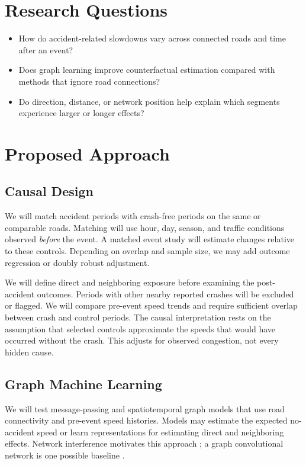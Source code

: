 \documentclass[sigconf,nonacm]{acmart}
\begin{document}
\section{Research Questions}
\begin{itemize}
    \item How do accident-related slowdowns vary across connected roads and time after an event?
    \item Does graph learning improve counterfactual estimation compared with methods that ignore road connections?
    \item Do direction, distance, or network position help explain which segments experience larger or longer effects?
\end{itemize}

\section{Proposed Approach}
\subsection{Causal Design}
We will match accident periods with crash-free periods on the same or comparable roads. Matching will use hour, day, season, and traffic conditions observed \emph{before} the event. A matched event study will estimate changes relative to these controls. Depending on overlap and sample size, we may add outcome regression or doubly robust adjustment.

We will define direct and neighboring exposure before examining the post-accident outcomes. Periods with other nearby reported crashes will be excluded or flagged. We will compare pre-event speed trends and require sufficient overlap between crash and control periods. The causal interpretation rests on the assumption that selected controls approximate the speeds that would have occurred without the crash. This adjusts for observed congestion, not every hidden cause.

\subsection{Graph Machine Learning}
We will test message-passing and spatiotemporal graph models that use road connectivity and pre-event speed histories. Models may estimate the expected no-accident speed or learn representations for estimating direct and neighboring effects. Network interference motivates this approach \cite{ma2021interference}; a graph convolutional network is one possible baseline \cite{kipf2017gcn}.
\end{document}
